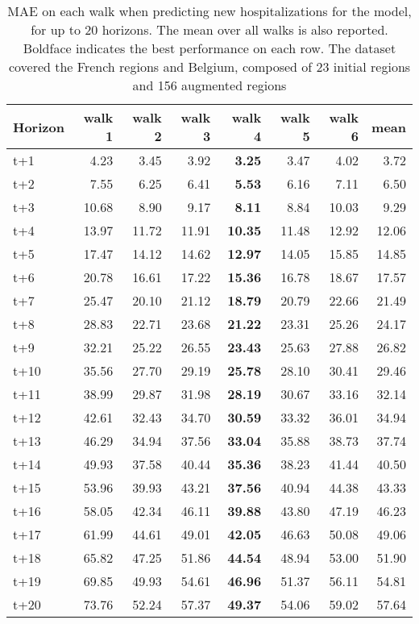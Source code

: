 \begin{table}[H]
\centering
\caption{MAE on each walk when predicting new hospitalizations for the model, for up to 20 horizons. The mean over all walks is also reported. Boldface indicates the best performance on each row. The dataset covered the French regions and Belgium, composed of 23 initial regions and 156 augmented regions }
\label{tab:MAE_walk_custom_linear_regression}
\begin{tabular}{lrrrrrrr}
\toprule
Horizon &  walk 1 &  walk 2 &  walk 3 &  walk 4 &  walk 5 &  walk 6 &  mean \\
\midrule
t+1  & 4.23  & 3.45  & 3.92  & \textbf{3.25}  & 3.47  & 4.02  & 3.72  \\
t+2  & 7.55  & 6.25  & 6.41  & \textbf{5.53}  & 6.16  & 7.11  & 6.50  \\
t+3  & 10.68  & 8.90  & 9.17  & \textbf{8.11}  & 8.84  & 10.03  & 9.29  \\
t+4  & 13.97  & 11.72  & 11.91  & \textbf{10.35}  & 11.48  & 12.92  & 12.06  \\
t+5  & 17.47  & 14.12  & 14.62  & \textbf{12.97}  & 14.05  & 15.85  & 14.85  \\
t+6  & 20.78  & 16.61  & 17.22  & \textbf{15.36}  & 16.78  & 18.67  & 17.57  \\
t+7  & 25.47  & 20.10  & 21.12  & \textbf{18.79}  & 20.79  & 22.66  & 21.49  \\
t+8  & 28.83  & 22.71  & 23.68  & \textbf{21.22}  & 23.31  & 25.26  & 24.17  \\
t+9  & 32.21  & 25.22  & 26.55  & \textbf{23.43}  & 25.63  & 27.88  & 26.82  \\
t+10  & 35.56  & 27.70  & 29.19  & \textbf{25.78}  & 28.10  & 30.41  & 29.46  \\
t+11  & 38.99  & 29.87  & 31.98  & \textbf{28.19}  & 30.67  & 33.16  & 32.14  \\
t+12  & 42.61  & 32.43  & 34.70  & \textbf{30.59}  & 33.32  & 36.01  & 34.94  \\
t+13  & 46.29  & 34.94  & 37.56  & \textbf{33.04}  & 35.88  & 38.73  & 37.74  \\
t+14  & 49.93  & 37.58  & 40.44  & \textbf{35.36}  & 38.23  & 41.44  & 40.50  \\
t+15  & 53.96  & 39.93  & 43.21  & \textbf{37.56}  & 40.94  & 44.38  & 43.33  \\
t+16  & 58.05  & 42.34  & 46.11  & \textbf{39.88}  & 43.80  & 47.19  & 46.23  \\
t+17  & 61.99  & 44.61  & 49.01  & \textbf{42.05}  & 46.63  & 50.08  & 49.06  \\
t+18  & 65.82  & 47.25  & 51.86  & \textbf{44.54}  & 48.94  & 53.00  & 51.90  \\
t+19  & 69.85  & 49.93  & 54.61  & \textbf{46.96}  & 51.37  & 56.11  & 54.81  \\
t+20  & 73.76  & 52.24  & 57.37  & \textbf{49.37}  & 54.06  & 59.02  & 57.64  \\

\bottomrule
\end{tabular}
\end{table}
